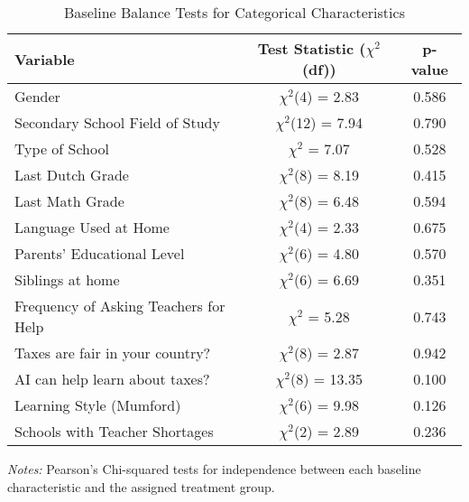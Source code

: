 \begin{table}[htbp]
\centering
\begin{threeparttable}
\caption{Baseline Balance Tests for Categorical Characteristics}
\label{tab:baseline_balance_cat_detailed}
\scriptsize
\begin{tabular}{@{}lcc@{}}
\toprule
Variable & Test Statistic ($\chi^2$(df)) & p-value \\
\midrule
Gender & $\chi^2$(4) = 2.83 & 0.586  \\
Secondary School Field of Study & $\chi^2$(12) = 7.94 & 0.790  \\
Type of School & $\chi^2$ = 7.07 & 0.528  \\
Last Dutch Grade & $\chi^2$(8) = 8.19 & 0.415  \\
Last Math Grade & $\chi^2$(8) = 6.48 & 0.594  \\
Language Used at Home & $\chi^2$(4) = 2.33 & 0.675  \\
Parents' Educational Level & $\chi^2$(6) = 4.80 & 0.570  \\
Siblings at home & $\chi^2$(6) = 6.69 & 0.351  \\
Frequency of Asking Teachers for Help & $\chi^2$ = 5.28 & 0.743  \\
Taxes are fair in your country? & $\chi^2$(8) = 2.87 & 0.942  \\
AI can help learn about taxes? & $\chi^2$(8) = 13.35 & 0.100  \\
Learning Style (Mumford) & $\chi^2$(6) = 9.98 & 0.126  \\
Schools with Teacher Shortages & $\chi^2$(2) = 2.89 & 0.236  \\
\bottomrule
\end{tabular}
\begin{tablenotes}
  \item[] \textit{Notes:} Pearson's Chi-squared tests for independence between each baseline characteristic and the assigned treatment group.
\end{tablenotes}
\end{threeparttable}
\end{table}
